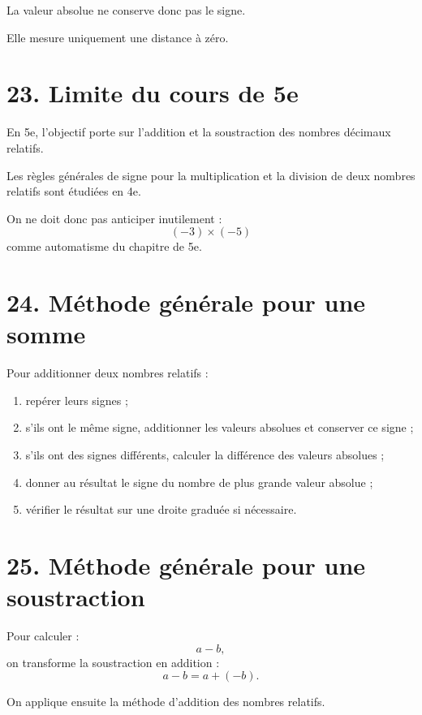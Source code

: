 La valeur absolue ne conserve donc pas le signe.

Elle mesure uniquement une distance à zéro.

\section{23. Limite du cours de 5e}

\begin{attention}
En 5e, l'objectif porte sur l'addition et la soustraction des nombres décimaux relatifs.

Les règles générales de signe pour la multiplication et la division de deux nombres relatifs sont étudiées en 4e.
\end{attention}

On ne doit donc pas anticiper inutilement :
\[
(-3)\times(-5)
\]
comme automatisme du chapitre de 5e.

\section{24. Méthode générale pour une somme}

\begin{methode}
Pour additionner deux nombres relatifs :
\begin{enumerate}
\item repérer leurs signes ;
\item s'ils ont le même signe, additionner les valeurs absolues et conserver ce signe ;
\item s'ils ont des signes différents, calculer la différence des valeurs absolues ;
\item donner au résultat le signe du nombre de plus grande valeur absolue ;
\item vérifier le résultat sur une droite graduée si nécessaire.
\end{enumerate}
\end{methode}

\section{25. Méthode générale pour une soustraction}

\begin{methode}
Pour calculer :
\[
a-b,
\]
on transforme la soustraction en addition :
\[
a-b=a+(-b).
\]

On applique ensuite la méthode d'addition des nombres relatifs.
\end{methode}

